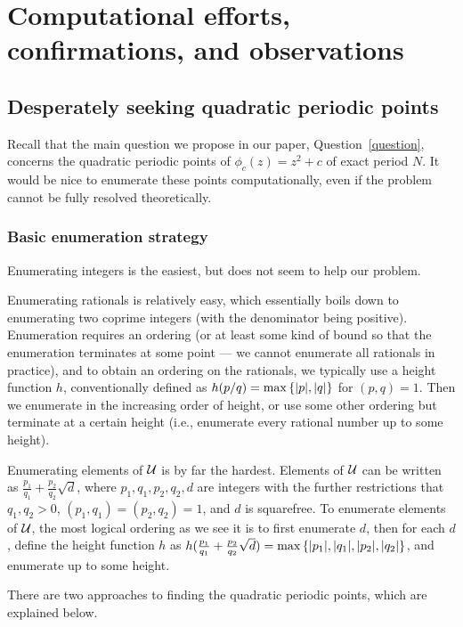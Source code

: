 \section{Computational efforts, confirmations, and observations}
\label{sec:comp}

\subsection{Desperately seeking quadratic periodic points}
\label{subsec:seek-quadratic}

Recall that the main question we propose in our paper,
Question~\ref{question}, concerns the quadratic periodic points of
$\phi_c(z) = z^2 + c$ of exact period $N$. It would be nice to
enumerate these points computationally, even if the problem cannot be
fully resolved theoretically.

\subsubsection{Basic enumeration strategy}
\label{sssec:enum}

Enumerating integers is the easiest, but does not seem to help our
problem.

Enumerating rationals is relatively easy, which essentially boils down
to enumerating two coprime integers (with the denominator being
positive). Enumeration requires an ordering (or at least some kind of
bound so that the enumeration terminates at some point --- we cannot
enumerate all rationals in practice), and to obtain an ordering on the
rationals, we typically use a height function $h$, conventionally
defined as $h(p/q) = \max\left\{|p|, |q|\right\}$ for $(p, q) = 1$. Then we
enumerate in the increasing order of height, or use some other
ordering but terminate at a certain height (i.e., enumerate every
rational number up to some height).

Enumerating elements of $\mathcal{U}$ is by far the hardest. Elements of $\mathcal{U}$
can be written as $\frac{p_1}{q_1} + \frac{p_2}{q_2}\sqrt{d}$, where
$p_1, q_1, p_2, q_2, d$ are integers with the further restrictions
that $q_1, q_2 > 0$, $(p_1, q_1) = (p_2, q_2) = 1$, and $d$ is
squarefree. To enumerate elements of $\mathcal{U}$, the most logical ordering
as we see it is to first enumerate $d$, then for each $d$, define the
height function $h$ as $h(\frac{p_1}{q_1} + \frac{p_2}{q_2}\sqrt{d}) =
\max\left\{|p_1|, |q_1|, |p_2|, |q_2|\right\}$, and enumerate up to some
height.

There are two approaches to finding the quadratic periodic points,
which are explained below.

